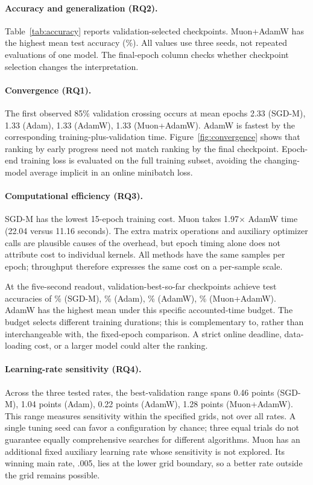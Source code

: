 \paragraph{Accuracy and generalization (RQ2).}
Table~\ref{tab:accuracy} reports validation-selected checkpoints. Muon+AdamW has the highest mean test accuracy (\%). All values use three seeds, not repeated evaluations of one model. The final-epoch column checks whether checkpoint selection changes the interpretation.


\paragraph{Convergence (RQ1).}
The first observed 85\% validation crossing occurs at mean epochs 2.33 (SGD-M), 1.33 (Adam), 1.33 (AdamW), 1.33 (Muon+AdamW). AdamW is fastest by the corresponding training-plus-validation time. Figure~\ref{fig:convergence} shows that ranking by early progress need not match ranking by the final checkpoint. Epoch-end training loss is evaluated on the full training subset, avoiding the changing-model average implicit in an online minibatch loss.
\paragraph{Computational efficiency (RQ3).}
SGD-M has the lowest 15-epoch training cost. Muon takes 1.97$\times$ AdamW time (22.04 versus 11.16 seconds). The extra matrix operations and auxiliary optimizer calls are plausible causes of the overhead, but epoch timing alone does not attribute cost to individual kernels. All methods have the same samples per epoch; throughput therefore expresses the same cost on a per-sample scale.


At the five-second readout, validation-best-so-far checkpoints achieve test accuracies of \% (SGD-M), \% (Adam), \% (AdamW), \% (Muon+AdamW). AdamW has the highest mean under this specific accounted-time budget. The budget selects different training durations; this is complementary to, rather than interchangeable with, the fixed-epoch comparison. A strict online deadline, data-loading cost, or a larger model could alter the ranking.
\paragraph{Learning-rate sensitivity (RQ4).}
Across the three tested rates, the best-validation range spans 0.46 points (SGD-M), 1.04 points (Adam), 0.22 points (AdamW), 1.28 points (Muon+AdamW). This range measures sensitivity within the specified grids, not over all rates. A single tuning seed can favor a configuration by chance; three equal trials do not guarantee equally comprehensive searches for different algorithms. Muon has an additional fixed auxiliary learning rate whose sensitivity is not explored. Its winning main rate, .005, lies at the lower grid boundary, so a better rate outside the grid remains possible.
